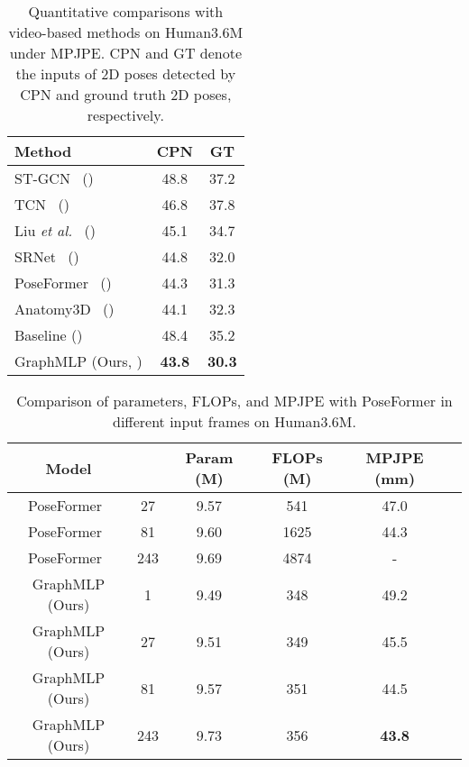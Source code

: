 \documentclass[lettersize,journal]{IEEEtran}
\begin{document}
\begin{table}[t]
\centering
\caption
{ 
Quantitative comparisons with video-based methods on Human3.6M under MPJPE.
CPN and GT denote the inputs of 2D poses detected by CPN and ground truth 2D poses, respectively. 
}
\setlength{\tabcolsep}{6.60mm} 
\begin{tabular}{l|cc}
\toprule [1pt]
Method &CPN &GT \\
\midrule [0.5pt]
ST-GCN~\cite{stgcn} () &48.8 &37.2 \\
TCN~\cite{videopose} () &46.8 &37.8 \\
Liu \emph{et al.}~\cite{liu2020attention} () &45.1 &34.7 \\
SRNet~\cite{zeng2020srnet} () &44.8 &32.0 \\
PoseFormer~\cite{poseformer} () &44.3 &31.3 \\
Anatomy3D~\cite{chen2021anatomy} () &44.1 &32.3 \\
\midrule [0.5pt]
Baseline () &48.4 &35.2 \\

GraphMLP (Ours, ) &\textbf{43.8} &\textbf{30.3} \\

\toprule [1pt]
\end{tabular}
\label{table:video}
\end{table}

\begin{table}[t]
\centering
\caption
{ 
  Comparison of parameters, FLOPs, and MPJPE  with PoseFormer in different input frames on Human3.6M. 
}  
\setlength{\tabcolsep}{0.60mm} 
\begin{tabular}{c|ccccc}
\toprule [1pt]
Model & &Param (M) &FLOPs (M) &MPJPE (mm) \\
\midrule [0.5pt]  
PoseFormer~\cite{poseformer} &27 &9.57 &541 &47.0 \\
PoseFormer~\cite{poseformer} &81 &9.60 &1625 &44.3 \\
PoseFormer~\cite{poseformer} &243 &9.69 &4874 &- \\
\midrule [0.5pt]

GraphMLP (Ours) &1 &9.49 &348 &49.2 & \\
GraphMLP (Ours) &27 &9.51 &349 &45.5 & \\
GraphMLP (Ours) &81 &9.57 &351 &44.5 & \\
GraphMLP (Ours) &243 &9.73 &356 &\textbf{43.8} & \\

\toprule [1pt]
\end{tabular}
\label{table:poseformer}
\end{table}
\end{document}
